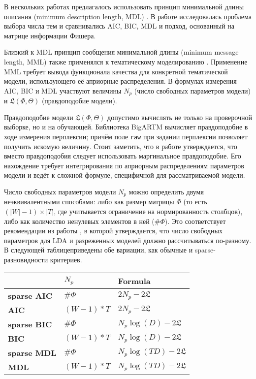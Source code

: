В нескольких работах предлагалось  использовать принцип минимальной длины описания (minimum description length, MDL) \cite{image_segm,gerlach2018network}. В работе \cite{mml0} исследовалась проблема выбора числа тем и сравнивались AIC, BIC, MDL и подход, основанный на матрице информации Фишера.

Близкий к MDL принцип сообщения минимальной длины (minimum message length, MML) также применялся к тематическому моделированию \cite{mml1,mml2,mml3,mml4,mml5}. 
Применение MML требует вывода функционала качества для конкретной тематической модели, использующего её априорные распределения. В формулах измерения AIC, BIC и MDL участвуют величины $N_p$ (число свободных параметров модели) и $\mathfrak{L}(\Phi,\Theta)$ (правдоподобие модели). 

Правдоподобие модели $\mathfrak{L}(\Phi,\Theta)$ допустимо вычислять не только на проверочной выборке, но и на обучающей. Библиотека BigARTM вычисляет правдоподобие в ходе измерения перплексии; причём поле \texttt{raw} при задании перплексии позволяет получить искомую величину. Стоит заметить, что в работе \cite{gerlach2018network} утверждается, что вместо правдоподобия следует использовать маргинальное правдоподобие. Его нахождение требует интегрирования по априорным распределениям параметров модели и ведёт к сложной формуле, специфичной для рассматриваемой модели.

Число свободных параметров модели $N_p$ можно определить двумя неэквивалентными способами: либо как размер матрицы $\Phi$ (то есть $(|W|-1) \times |T|$, где учитывается ограничение на нормированность столбцов), либо как количество ненулевых элементов в ней ($\#\Phi$). Это соответствует рекомендации из работы \cite{than2012fully}, в которой утверждается, что число свободных параметров для LDA и разреженных моделей должно рассчитываться по-разному. В следующей таблицеприведены обе вариации, как обычные и sparse-разновидности критериев.

\begin{table}[h]
    \centering
    \begin{tabular}{lll}
    \toprule
               & $N_p$       & Formula                                             \\
    \midrule
    \textbf{sparse AIC} & $\#\Phi$       & $2 N_p - 2 \mathfrak{L}$                \\
    \textbf{AIC}        & $(W - 1) * T$  & $2 N_p - 2 \mathfrak{L}$                \\
    \textbf{sparse BIC} & $\#\Phi$       & $N_p \log(D) - 2 \mathfrak{L}$          \\
    \textbf{BIC}        & $(W - 1) * T$  & $N_p \log(D) - 2 \mathfrak{L}$          \\
    \textbf{sparse MDL} & $\#\Phi$       & $N_p \log(TD) - 2 \mathfrak{L}$         \\
    \textbf{MDL}        & $(W - 1) * T$  & $N_p \log(TD) - 2 \mathfrak{L}$\\
    \bottomrule
    \end{tabular}
\end{table}

